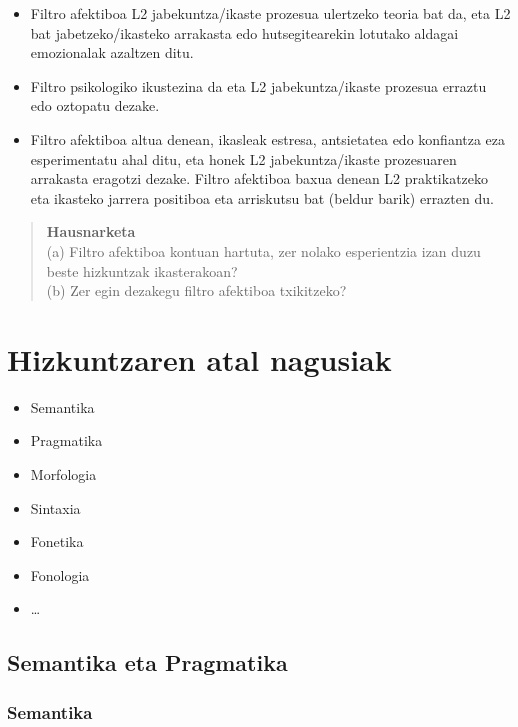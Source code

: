 \documentclass[
]{book}
\providecommand{\tightlist}{%
  \setlength{\itemsep}{0pt}\setlength{\parskip}{0pt}}
\begin{document}
\begin{itemize}
\tightlist
\item
  Filtro afektiboa L2 jabekuntza/ikaste prozesua ulertzeko teoria bat da, eta L2 bat jabetzeko/ikasteko arrakasta edo hutsegitearekin lotutako aldagai emozionalak azaltzen ditu.
\item
  Filtro psikologiko ikustezina da eta L2 jabekuntza/ikaste prozesua erraztu edo oztopatu dezake.
\item
  Filtro afektiboa altua denean, ikasleak estresa, antsietatea edo konfiantza eza esperimentatu ahal ditu, eta honek L2 jabekuntza/ikaste prozesuaren arrakasta eragotzi dezake. Filtro afektiboa baxua denean L2 praktikatzeko eta ikasteko jarrera positiboa eta arriskutsu bat (beldur barik) errazten du.
\end{itemize}

\begin{quote}
\textbf{Hausnarketa}\\
(a) Filtro afektiboa kontuan hartuta, zer nolako esperientzia izan duzu beste hizkuntzak ikasterakoan?\\
(b) Zer egin dezakegu filtro afektiboa txikitzeko?
\end{quote}

\hypertarget{hizkuntzaren-atal-nagusiak}{%
\section{Hizkuntzaren atal nagusiak}\label{hizkuntzaren-atal-nagusiak}}

\begin{itemize}
\tightlist
\item
  Semantika
\item
  Pragmatika
\item
  Morfologia
\item
  Sintaxia
\item
  Fonetika
\item
  Fonologia
\item
  \ldots{}
\end{itemize}

\hypertarget{semantika-eta-pragmatika}{%
\subsection{Semantika eta Pragmatika}\label{semantika-eta-pragmatika}}

\hypertarget{semantika}{%
\subsubsection{Semantika}\label{semantika}}
\end{document}
